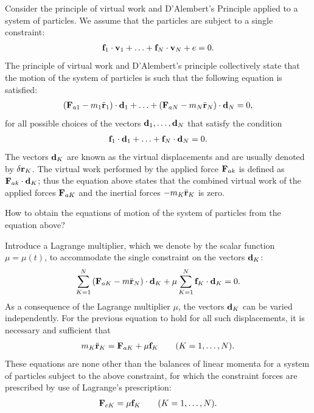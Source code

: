 \documentclass[
  letterpaper,
  DIV=11,
  numbers=noendperiod]{scrreprt}
\newcounter{none} %
\newcommand{\lp}{\left(}
\newcommand{\rp}{\right)}
\providecommand{\hdots}{\ldots}
\begin{document}
Consider the principle of virtual work and D'Alembert's Principle
applied to a system of particles. We assume that the particles are
subject to a single constraint: \begin{align*}
    {\bf f}_1\cdot{\bf v}_1+\hdots+{\bf f}_N\cdot{\bf v}_N + e = 0.
\end{align*} The principle of virtual work and D'Alembert's principle
collectively state that the motion of the system of particles is such
that the following equation is satisfied: \begin{align}
    \begin{split}
        \lp {\bf F}_{a1}-m_1\ddot{\bf r}_1\rp\cdot{\bf d}_1+\hdots+\lp {\bf F}_{aN}-m_N\ddot{\bf r}_N\rp\cdot{\bf d}_N = 0,
    \end{split}
\end{align} for all possible choices of the vectors
\({\bf d}_1, \hdots, {\bf d}_N\) that satisfy the condition
\begin{align}
    \begin{split}
        {\bf f}_1\cdot{\bf d}_1+\hdots+{\bf f}_N\cdot{\bf d}_N = 0.
    \end{split}
\end{align} The vectors \({\bf d}_K\) are known as the virtual
displacements and are usually denoted by \(\delta {\bf r}_K\). The
virtual work performed by the applied force \({\bf F}_{ak}\) is defined
as \({\bf F}_{ak}\cdot{\bf d}_K\); thus the equation above states that
the combined virtual work of the applied forces \({\bf F}_{aK}\) and the
inertial forces \(-m_K\ddot{\bf r}_K\) is zero.

How to obtain the equations of motion of the system of particles from
the equation above?

Introduce a Lagrange multiplier, which we denote by the scalar function
\(\mu = \mu(t)\), to accommodate the single constraint on the vectors
\({\bf d}_K\): \begin{align}
    \begin{split}
        \sum_{K=1}^N\lp{\bf F}_{aK}-m\ddot{\bf r}_N\rp\cdot{\bf d}_K+\mu\sum_{K=1}^N{\bf f}_K\cdot{\bf d}_K = 0.
    \end{split}
\end{align} As a consequence of the Lagrange multiplier \(\mu\), the
vectors \({\bf d}_K\) can be varied independently. For the previous
equation to hold for all such displacements, it is necessary and
sufficient that \begin{align}
    \begin{split}
        m_K\ddot{\bf r}_K = {\bf F}_{aK}+\mu{\bf f}_K \qquad (K=1,\hdots,N).
    \end{split}
\end{align} These equations are none other than the balances of linear
momenta for a system of particles subject to the above constraint, for
which the constraint forces are prescribed by use of Lagrange's
prescription: \begin{align}
    \begin{split}
        {\bf F}_{cK} = \mu{\bf f}_K\qquad (K=1,\dots,N).
    \end{split}
\end{align}
\end{document}
